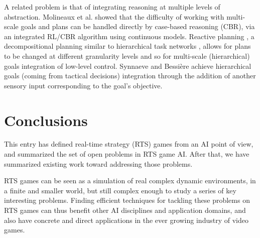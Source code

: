 \documentclass{llncs}
\begin{document}
A related problem is that  of integrating reasoning at multiple levels
of abstraction.  Molineaux et  al. \cite{Molineaux08} showed  that the
difficulty of working with multi-scale  goals and plans can be handled
directly  by  case-based reasoning  (CBR),  via  an integrated  RL/CBR
algorithm     using    continuous     models.    Reactive     planning
\cite{WeberCig10}, a decompositional  planning similar to hierarchical
task networks  \cite{HTNPlanning}, allows for  plans to be  changed at
different  granularity levels  and so  for multi-scale  (hierarchical)
goals  integration of  low-level  control.  Synnaeve and  Bessi\`{e}re
\cite{SynnaeveMicroCig11}  achieve  hierarchical  goals  (coming  from
tactical  decisions)  integration  through  the  addition  of  another
sensory input corresponding to the goal's objective.


\section*{Conclusions}

This entry has defined real-time strategy (RTS) games from an AI point of view, and summarized the set of open problems in RTS game AI. After that, we have summarized existing work toward addressing those problems.

RTS games can be seen as a simulation of real complex dynamic environments, in a finite and smaller world, but still complex enough to study a series of key interesting problems. Finding efficient techniques for tackling these problems on RTS games can thus benefit other  AI disciplines and  application domains, and  also have concrete and direct applications in the ever growing industry of video games.





\end{document}
